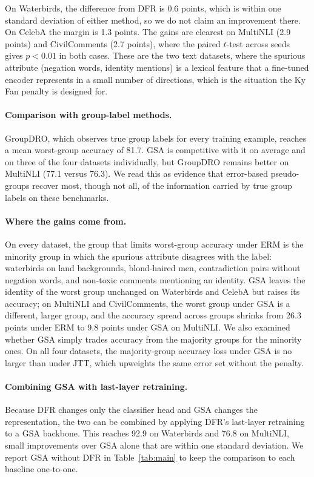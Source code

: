 \documentclass{article}
\begin{document}
On Waterbirds, the difference from DFR is 0.6 points, which is within one standard deviation of either method, so we do not claim an improvement there. On CelebA the margin is 1.3 points. The gains are clearest on MultiNLI (2.9 points) and CivilComments (2.7 points), where the paired $t$-test across seeds gives $p < 0.01$ in both cases. These are the two text datasets, where the spurious attribute (negation words, identity mentions) is a lexical feature that a fine-tuned encoder represents in a small number of directions, which is the situation the Ky Fan penalty is designed for.

\paragraph{Comparison with group-label methods.}
GroupDRO, which observes true group labels for every training example, reaches a mean worst-group accuracy of 81.7. GSA is competitive with it on average and on three of the four datasets individually, but GroupDRO remains better on MultiNLI (77.1 versus 76.3). We read this as evidence that error-based pseudo-groups recover most, though not all, of the information carried by true group labels on these benchmarks.

\paragraph{Where the gains come from.}
On every dataset, the group that limits worst-group accuracy under ERM is the minority group in which the spurious attribute disagrees with the label: waterbirds on land backgrounds, blond-haired men, contradiction pairs without negation words, and non-toxic comments mentioning an identity. GSA leaves the identity of the worst group unchanged on Waterbirds and CelebA but raises its accuracy; on MultiNLI and CivilComments, the worst group under GSA is a different, larger group, and the accuracy spread across groups shrinks from 26.3 points under ERM to 9.8 points under GSA on MultiNLI. We also examined whether GSA simply trades accuracy from the majority groups for the minority ones. On all four datasets, the majority-group accuracy loss under GSA is no larger than under JTT, which upweights the same error set without the penalty.

\paragraph{Combining GSA with last-layer retraining.}
Because DFR changes only the classifier head and GSA changes the representation, the two can be combined by applying DFR's last-layer retraining to a GSA backbone. This reaches 92.9 on Waterbirds and 76.8 on MultiNLI, small improvements over GSA alone that are within one standard deviation. We report GSA without DFR in Table~\ref{tab:main} to keep the comparison to each baseline one-to-one.
\end{document}
